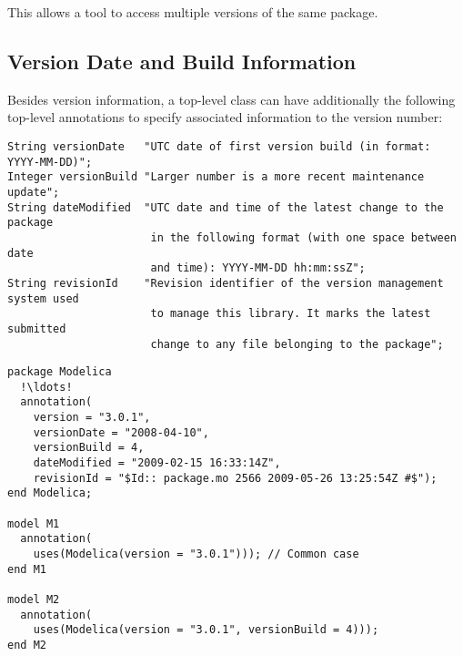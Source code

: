 This allows a tool to access multiple versions of the same package.

\subsection{Version Date and Build Information}\label{version-date-and-build-information}

Besides version information, a top-level class can have additionally the following top-level annotations to specify associated information to the version number:%
\begin{lstlisting}[language=modelica]
String versionDate   "UTC date of first version build (in format: YYYY-MM-DD)";
Integer versionBuild "Larger number is a more recent maintenance update";
String dateModified  "UTC date and time of the latest change to the package
                      in the following format (with one space between date
                      and time): YYYY-MM-DD hh:mm:ssZ";
String revisionId    "Revision identifier of the version management system used
                      to manage this library. It marks the latest submitted
                      change to any file belonging to the package";
\end{lstlisting}%

\begin{example}
\begin{lstlisting}[language=modelica,mathescape=false,escapechar=!]
package Modelica
  !\ldots!
  annotation(
    version = "3.0.1",
    versionDate = "2008-04-10",
    versionBuild = 4,
    dateModified = "2009-02-15 16:33:14Z",
    revisionId = "$Id:: package.mo 2566 2009-05-26 13:25:54Z #$");
end Modelica;

model M1
  annotation(
    uses(Modelica(version = "3.0.1"))); // Common case
end M1

model M2
  annotation(
    uses(Modelica(version = "3.0.1", versionBuild = 4)));
end M2
\end{lstlisting}
\end{example}

